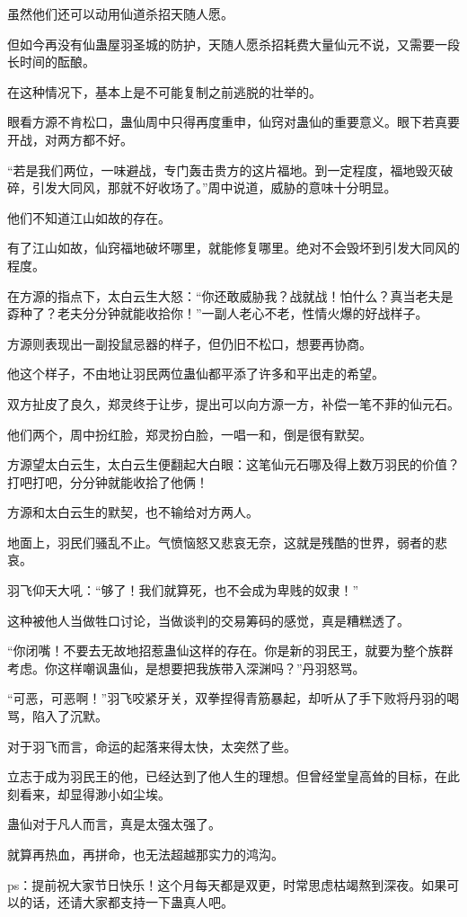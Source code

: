 \begin{this_body}
虽然他们还可以动用仙道杀招天随人愿。

但如今再没有仙蛊屋羽圣城的防护，天随人愿杀招耗费大量仙元不说，又需要一段长时间的酝酿。

在这种情况下，基本上是不可能复制之前逃脱的壮举的。

眼看方源不肯松口，蛊仙周中只得再度重申，仙窍对蛊仙的重要意义。眼下若真要开战，对两方都不好。

“若是我们两位，一味避战，专门轰击贵方的这片福地。到一定程度，福地毁灭破碎，引发大同风，那就不好收场了。”周中说道，威胁的意味十分明显。

他们不知道江山如故的存在。

有了江山如故，仙窍福地破坏哪里，就能修复哪里。绝对不会毁坏到引发大同风的程度。

在方源的指点下，太白云生大怒：“你还敢威胁我？战就战！怕什么？真当老夫是孬种了？老夫分分钟就能收拾你！”一副人老心不老，性情火爆的好战样子。

方源则表现出一副投鼠忌器的样子，但仍旧不松口，想要再协商。

他这个样子，不由地让羽民两位蛊仙都平添了许多和平出走的希望。

双方扯皮了良久，郑灵终于让步，提出可以向方源一方，补偿一笔不菲的仙元石。

他们两个，周中扮红脸，郑灵扮白脸，一唱一和，倒是很有默契。

方源望太白云生，太白云生便翻起大白眼：这笔仙元石哪及得上数万羽民的价值？打吧打吧，分分钟就能收拾了他俩！

方源和太白云生的默契，也不输给对方两人。

地面上，羽民们骚乱不止。气愤恼怒又悲哀无奈，这就是残酷的世界，弱者的悲哀。

羽飞仰天大吼：“够了！我们就算死，也不会成为卑贱的奴隶！”

这种被他人当做牲口讨论，当做谈判的交易筹码的感觉，真是糟糕透了。

“你闭嘴！不要去无故地招惹蛊仙这样的存在。你是新的羽民王，就要为整个族群考虑。你这样嘲讽蛊仙，是想要把我族带入深渊吗？”丹羽怒骂。

“可恶，可恶啊！”羽飞咬紧牙关，双拳捏得青筋暴起，却听从了手下败将丹羽的喝骂，陷入了沉默。

对于羽飞而言，命运的起落来得太快，太突然了些。

立志于成为羽民王的他，已经达到了他人生的理想。但曾经堂皇高耸的目标，在此刻看来，却显得渺小如尘埃。

蛊仙对于凡人而言，真是太强太强了。

就算再热血，再拼命，也无法超越那实力的鸿沟。

ps：提前祝大家节日快乐！这个月每天都是双更，时常思虑枯竭熬到深夜。如果可以的话，还请大家都支持一下蛊真人吧。

\end{this_body}

